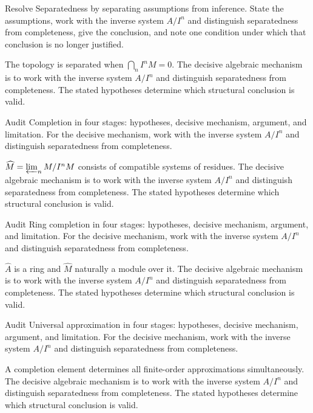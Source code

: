 \begin{problem}\label{prob:v18-problem-03}
Resolve Separatedness by separating assumptions from inference. State the assumptions, work with the inverse system \(A/I^n\) and distinguish separatedness from completeness, give the conclusion, and note one condition under which that conclusion is no longer justified.
\end{problem}
\begin{solution}
The topology is separated when $\bigcap_n I^nM=0$. The decisive algebraic mechanism is to work with the inverse system \(A/I^n\) and distinguish separatedness from completeness. The stated hypotheses determine which structural conclusion is valid.
\end{solution}

\begin{problem}\label{prob:v18-problem-04}
Audit Completion in four stages: hypotheses, decisive mechanism, argument, and limitation. For the decisive mechanism, work with the inverse system \(A/I^n\) and distinguish separatedness from completeness.
\end{problem}
\begin{solution}
$\widehat M=\varprojlim_n M/I^nM$ consists of compatible systems of residues. The decisive algebraic mechanism is to work with the inverse system \(A/I^n\) and distinguish separatedness from completeness. The stated hypotheses determine which structural conclusion is valid.
\end{solution}

\begin{problem}\label{prob:v18-problem-05}
Audit Ring completion in four stages: hypotheses, decisive mechanism, argument, and limitation. For the decisive mechanism, work with the inverse system \(A/I^n\) and distinguish separatedness from completeness.
\end{problem}
\begin{solution}
$\widehat A$ is a ring and $\widehat M$ naturally a module over it. The decisive algebraic mechanism is to work with the inverse system \(A/I^n\) and distinguish separatedness from completeness. The stated hypotheses determine which structural conclusion is valid.
\end{solution}

\begin{problem}\label{prob:v18-problem-06}
Audit Universal approximation in four stages: hypotheses, decisive mechanism, argument, and limitation. For the decisive mechanism, work with the inverse system \(A/I^n\) and distinguish separatedness from completeness.
\end{problem}
\begin{solution}
A completion element determines all finite-order approximations simultaneously. The decisive algebraic mechanism is to work with the inverse system \(A/I^n\) and distinguish separatedness from completeness. The stated hypotheses determine which structural conclusion is valid.
\end{solution}

